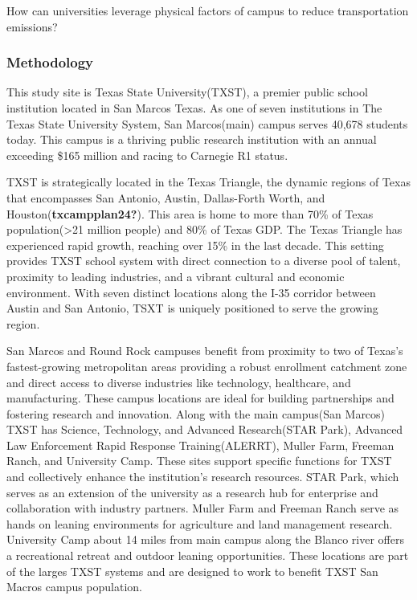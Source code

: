 \documentclass[
  letterpaper,
  DIV=11,
  numbers=noendperiod]{scrartcl}
\begin{document}
How can universities leverage physical factors of campus to reduce
transportation emissions?

\subsubsection{Methodology}\label{methodology}

This study site is Texas State University(TXST), a premier public school
institution located in San Marcos Texas. As one of seven institutions in
The Texas State University System, San Marcos(main) campus serves 40,678
students today. This campus is a thriving public research institution
with an annual exceeding \$165 million and racing to Carnegie R1 status.

TXST is strategically located in the Texas Triangle, the dynamic regions
of Texas that encompasses San Antonio, Austin, Dallas-Forth Worth, and
Houston(\textbf{txcampplan24?}). This area is home to more than 70\% of
Texas population(\textgreater21 million people) and 80\% of Texas GDP.
The Texas Triangle has experienced rapid growth, reaching over 15\% in
the last decade. This setting provides TXST school system with direct
connection to a diverse pool of talent, proximity to leading industries,
and a vibrant cultural and economic environment. With seven distinct
locations along the I-35 corridor between Austin and San Antonio, TSXT
is uniquely positioned to serve the growing region.

San Marcos and Round Rock campuses benefit from proximity to two of
Texas's fastest-growing metropolitan areas providing a robust enrollment
catchment zone and direct access to diverse industries like technology,
healthcare, and manufacturing. These campus locations are ideal for
building partnerships and fostering research and innovation. Along with
the main campus(San Marcos) TXST has Science, Technology, and Advanced
Research(STAR Park), Advanced Law Enforcement Rapid Response
Training(ALERRT), Muller Farm, Freeman Ranch, and University Camp. These
sites support specific functions for TXST and collectively enhance the
institution's research resources. STAR Park, which serves as an
extension of the university as a research hub for enterprise and
collaboration with industry partners. Muller Farm and Freeman Ranch
serve as hands on leaning environments for agriculture and land
management research. University Camp about 14 miles from main campus
along the Blanco river offers a recreational retreat and outdoor leaning
opportunities. These locations are part of the larges TXST systems and
are designed to work to benefit TXST San Macros campus population.
\end{document}
